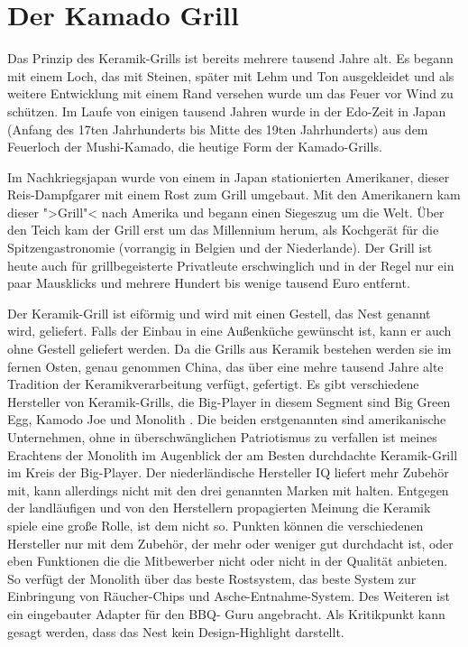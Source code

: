 \section{Der Kamado Grill}

	Das Prinzip des Keramik-Grills ist bereits mehrere tausend Jahre alt. Es begann 
	mit einem Loch, das 
	mit Steinen, später mit Lehm und Ton ausgekleidet und als weitere Entwicklung 
	mit 
	einem Rand versehen wurde um das Feuer vor Wind zu schützen. 
	Im Laufe von einigen tausend Jahren wurde in der Edo-Zeit in Japan (Anfang 
	des 17ten Jahrhunderts 
	bis Mitte des 19ten Jahrhunderts) aus dem Feuerloch der Mushi-Kamado, die 
	heutige Form
	der Kamado-Grills.
	
	Im Nachkriegsjapan wurde von einem in Japan stationierten Amerikaner, dieser 
	Reis-Dampfgarer mit 
	einem Rost zum Grill umgebaut. Mit den Amerikanern kam dieser ">Grill"< nach 
	Amerika und begann 
	einen Siegeszug um die Welt. Über den Teich kam der Grill erst um das 
	Millennium herum, als 
	Kochgerät für die Spitzengastronomie (vorrangig in Belgien und der 
	Niederlande). Der Grill ist heute
	auch für grillbegeisterte Privatleute erschwinglich und in der Regel nur ein paar 
	Mausklicks und 
	mehrere Hundert bis wenige tausend Euro entfernt.
	
	Der Keramik-Grill ist eiförmig und wird mit einen Gestell, das Nest genannt 
	wird, geliefert. Falls der 
	Einbau in eine Außenküche gewünscht ist, kann er auch ohne Gestell geliefert 
	werden.
	Da die Grills aus Keramik bestehen werden sie im fernen Osten, genau 
	genommen China, das über 
	eine mehre tausend Jahre alte Tradition der Keramikverarbeitung verfügt, 
	gefertigt. Es gibt 
	verschiedene Hersteller von Keramik-Grills, die Big-Player in diesem Segment 
	sind Big Green Egg, 
	Kamodo Joe und Monolith . Die beiden erstgenannten sind amerikanische 
	Unternehmen, ohne in 
	überschwänglichen Patriotismus zu verfallen ist meines Erachtens der Monolith 
	im Augenblick der am 
	Besten durchdachte Keramik-Grill im Kreis der Big-Player. Der niederländische 
	Hersteller IQ liefert 
	mehr Zubehör mit, kann allerdings nicht mit den drei genannten Marken mit 
	halten. Entgegen der 
	landläufigen und von den Herstellern propagierten Meinung die Keramik spiele 
	eine große Rolle, ist 
	dem nicht so. Punkten können die verschiedenen Hersteller nur mit dem 
	Zubehör, der mehr oder 
	weniger gut durchdacht ist, oder eben Funktionen die die Mitbewerber nicht 
	oder nicht in der Qualität 
	anbieten. So verfügt der Monolith über das beste Rostsystem, das beste 
	System zur Einbringung von 
	Räucher-Chips und Asche-Entnahme-System. Des Weiteren ist ein eingebauter 
	Adapter für den BBQ-
	Guru angebracht. Als Kritikpunkt kann gesagt werden, dass das Nest kein 
	Design-Highlight darstellt.
 
